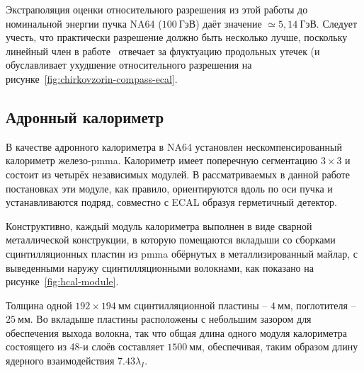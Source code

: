 Экстраполяция оценки относительного разрешения из этой работы до номинальной
энергии пучка NA64 ($100~\text{ГэВ}$) даёт значение $\simeq 5{,}14~\text{ГэВ}$.
Следует учесть, что практически разрешение должно быть несколько лучше,
поскольку линейный член в работе~\cite{chirkovzorin-compass-ecal}
отвечает за флуктуацию продольных утечек (и обуславливает ухудшение
относительного разрешения на рисунке~\ref{fig:chirkovzorin-compass-ecal}.




\subsection{Адронный калориметр}

В качестве адронного калориметра в NA64 установлен
нескомпенсированный калориметр железо-\acrshort{pmma}.
Калориметр имеет поперечную сегментацию $3\times3$
и состоит из четырёх независимых модулей. В рассматриваемых
в данной работе постановках эти модуле, как правило, ориентируются
вдоль по оси пучка и устанавливаются подряд, совместно с ECAL
образуя герметичный детектор.

Конструктивно, каждый модуль калориметра выполнен в виде
сварной металлической конструкции, в которую помещаются
вкладыши со сборками сцинтилляционных пластин из \acrshort{pmma}
обёрнутых в металлизированный майлар, с выведенными наружу
сцинтилляционными волокнами, как показано на рисунке~\ref{fig:hcal-module}.

Толщина одной $192\times194~\text{мм}$ сцинтилляционной
пластины -- $4~\text{мм}$, поглотителя -- $25~\text{мм}$.
Во вкладыше пластины расположены с небольшим зазором для обеспечения
выхода волокна, так что общая длина одного модуля калориметра
состоящего из 48-и слоёв составляет $1500~\text{мм}$, обеспечивая,
таким образом длину ядерного взаимодействия $7.43 \lambda_I$.

